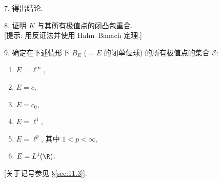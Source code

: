 \begin{problem}
7. 得出结论.

8. 证明 $K$ 与其所有极值点的闭凸包重合.\\
{[提示: 用反证法并使用 Hahn--Banach 定理.]}

9. 确定在下述情形下 $B_E$ ($=E$ 的闭单位球) 的所有极值点的集合 $\mathcal{E}$:
\begin{enumerate}[label=(\alph*), itemsep=0.1em]
	\item $E=\ell^\infty$,
	\item $E=c$,
	\item $E=c_0$,
	\item $E=\ell^1$,
	\item $E=\ell^p$, 其中 $1<p<\infty$,
	\item $E=L^1(\R)$.
\end{enumerate}
[关于记号参见 \S \ref{sec:11.3}].
\end{problem}

